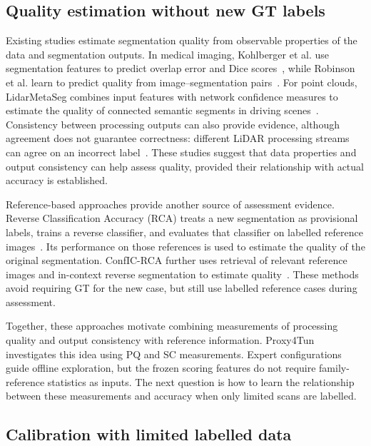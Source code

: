 \documentclass[a4paper,fleqn]{cas-dc}
\begin{document}
{\subsection{Quality estimation without new GT labels}

Existing studies estimate segmentation quality from observable properties of the data and segmentation outputs. In medical imaging, Kohlberger et al. use segmentation features to predict overlap error and Dice scores~\cite{kohlberger2012evaluating}, while Robinson et al. learn to predict quality from image--segmentation pairs~\cite{robinson2018segmentationQuality}. For point clouds, LidarMetaSeg combines input features with network confidence measures to estimate the quality of connected semantic segments in driving scenes~\cite{colling2021lidarmetaseg}. Consistency between processing outputs can also provide evidence, although agreement does not guarantee correctness: different LiDAR processing streams can agree on an incorrect label~\cite{bogdoll2025labelfree}. These studies suggest that data properties and output consistency can help assess quality, provided their relationship with actual accuracy is established.

Reference-based approaches provide another source of assessment evidence. Reverse Classification Accuracy (RCA) treats a new segmentation as provisional labels, trains a reverse classifier, and evaluates that classifier on labelled reference images~\cite{valindria2017rca}. Its performance on those references is used to estimate the quality of the original segmentation. ConfIC-RCA further uses retrieval of relevant reference images and in-context reverse segmentation to estimate quality~\cite{cosarinsky2026conficrca}. These methods avoid requiring GT for the new case, but still use labelled reference cases during assessment.

Together, these approaches motivate combining measurements of processing quality and output consistency with reference information. Proxy4Tun investigates this idea using PQ and SC measurements. Expert configurations guide offline exploration, but the frozen scoring features do not require family-reference statistics as inputs. The next question is how to learn the relationship between these measurements and accuracy when only limited scans are labelled.

\subsection{Calibration with limited labelled data}

}
\end{document}
